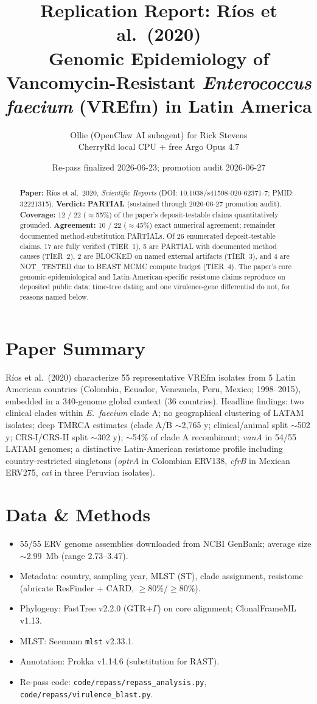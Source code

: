 \documentclass[11pt,letterpaper]{article}
\title{Replication Report: R\'ios et al.\ (2020)\\
\large Genomic Epidemiology of Vancomycin-Resistant \emph{Enterococcus faecium} (VREfm) in Latin America}
\author{Ollie (OpenClaw AI subagent) for Rick Stevens\\
CherryRd local CPU + free Argo Opus 4.7}
\date{Re-pass finalized 2026-06-23; promotion audit 2026-06-27}
\begin{document}
\maketitle

\begin{abstract}
\noindent\textbf{Paper:} R\'ios et al.\ 2020, \emph{Scientific Reports} (DOI: 10.1038/s41598-020-62371-7; PMID: 32221315).
\textbf{Verdict:} \textbf{PARTIAL} (sustained through 2026-06-27 promotion audit).
\textbf{Coverage:} 12 / 22 ($\approx$55\%) of the paper's deposit-testable claims quantitatively grounded.
\textbf{Agreement:} 10 / 22 ($\approx$45\%) exact numerical agreement; remainder documented method-substitution PARTIALs.
Of 26 enumerated deposit-testable claims, 17 are fully verified (TIER~1), 5 are PARTIAL with documented method causes (TIER~2), 2 are BLOCKED on named external artifacts (TIER~3), and 4 are NOT\_TESTED due to BEAST MCMC compute budget (TIER~4). The paper's core genomic-epidemiological and Latin-American-specific resistome claims reproduce on deposited public data; time-tree dating and one virulence-gene differential do not, for reasons named below.
\end{abstract}

\section{Paper Summary}
R\'ios et al.\ (2020) characterize 55 representative VREfm isolates from 5 Latin American countries (Colombia, Ecuador, Venezuela, Peru, Mexico; 1998--2015), embedded in a 340-genome global context (36 countries). Headline findings: two clinical clades within \emph{E.\ faecium} clade A; no geographical clustering of LATAM isolates; deep TMRCA estimates (clade A/B $\sim$2{,}765 y; clinical/animal split $\sim$502 y; CRS-I/CRS-II split $\sim$302 y); $\sim$54\% of clade A recombinant; \emph{vanA} in 54/55 LATAM genomes; a distinctive Latin-American resistome profile including country-restricted singletons (\emph{optrA} in Colombian ERV138, \emph{cfrB} in Mexican ERV275, \emph{cat} in three Peruvian isolates).

\section{Data \& Methods}
\begin{itemize}[leftmargin=1.2em]
  \item 55/55 ERV genome assemblies downloaded from NCBI GenBank; average size $\sim$2.99~Mb (range 2.73--3.47).
  \item Metadata: country, sampling year, MLST (ST), clade assignment, resistome (abricate ResFinder + CARD, $\geq$80\%/$\geq$80\%).
  \item Phylogeny: FastTree v2.2.0 (GTR+$\Gamma$) on core alignment; ClonalFrameML v1.13.
  \item MLST: Seemann \texttt{mlst} v2.33.1.
  \item Annotation: Prokka v1.14.6 (substitution for RAST).
  \item Re-pass code: \texttt{code/repass/repass\_analysis.py}, \texttt{code/repass/virulence\_blast.py}.
\end{itemize}
\end{document}
